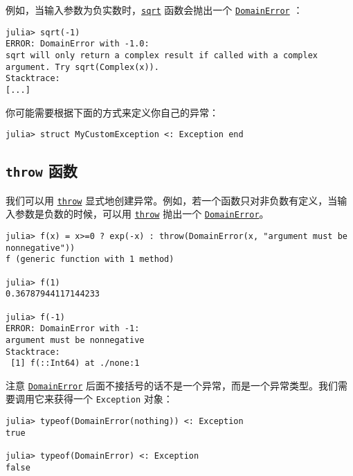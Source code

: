 例如，当输入参数为负实数时，\hyperlink{4551113327515323898}{\texttt{sqrt}} 函数会抛出一个 \hyperlink{14085880504701688639}{\texttt{DomainError}} ：




\begin{verbatim}
julia> sqrt(-1)
ERROR: DomainError with -1.0:
sqrt will only return a complex result if called with a complex argument. Try sqrt(Complex(x)).
Stacktrace:
[...]
\end{verbatim}



你可能需要根据下面的方式来定义你自己的异常：




\begin{verbatim}
julia> struct MyCustomException <: Exception end
\end{verbatim}



\hypertarget{11451631637715363921}{}


\subsection{\texttt{throw} 函数}



我们可以用 \hyperlink{16410366672587017456}{\texttt{throw}} 显式地创建异常。例如，若一个函数只对非负数有定义，当输入参数是负数的时候，可以用 \hyperlink{16410366672587017456}{\texttt{throw}} 抛出一个 \hyperlink{14085880504701688639}{\texttt{DomainError}}。




\begin{verbatim}
julia> f(x) = x>=0 ? exp(-x) : throw(DomainError(x, "argument must be nonnegative"))
f (generic function with 1 method)

julia> f(1)
0.36787944117144233

julia> f(-1)
ERROR: DomainError with -1:
argument must be nonnegative
Stacktrace:
 [1] f(::Int64) at ./none:1
\end{verbatim}



注意 \hyperlink{14085880504701688639}{\texttt{DomainError}} 后面不接括号的话不是一个异常，而是一个异常类型。我们需要调用它来获得一个 \texttt{Exception} 对象：




\begin{verbatim}
julia> typeof(DomainError(nothing)) <: Exception
true

julia> typeof(DomainError) <: Exception
false
\end{verbatim}



